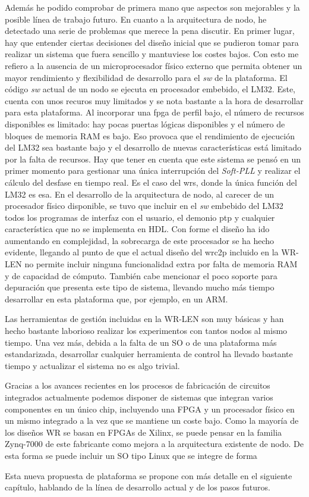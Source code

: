 Además he podido comprobar de primera mano que aspectos son mejorables y la 
posible línea de trabajo futuro. En cuanto a la arquitectura de nodo, he 
detectado una serie de problemas que merece la pena discutir. En primer lugar, 
hay que entender ciertas decisiones del diseño inicial que se pudieron tomar 
para realizar un sistema que fuera sencillo y mantuviese los costes bajos. Con 
esto me refiero a la ausencia de un microprocesador físico externo que permita 
obtener un mayor rendimiento y flexibilidad de desarrollo para el \textit{sw} 
de la plataforma. El código \textit{sw} actual de un nodo se ejecuta en 
procesador embebido, el LM32. Este, cuenta con unos recuros muy limitados y se 
nota 
bastante a la hora de desarrollar para esta plataforma. Al incorporar una 
\gls{fpga} de perfil bajo, el número de recursos disponibles es limitado: hay 
pocas puertas lógicas disponibles y el número de bloques de memoria RAM es 
bajo. Eso provoca que el rendimiento de ejecución del LM32 sea bastante bajo y 
el desarrollo de nuevas características está limitado por la falta de recursos. 
Hay que tener en cuenta que este sistema se pensó en un primer momento para 
gestionar una única interrupción del \textit{Soft-PLL} y realizar el cálculo 
del desfase en tiempo real. Es el caso del \gls{wrs}, donde la única función 
del LM32 es esa. En el desarrollo de la arquitectura de nodo, al carecer de un 
procesador físico disponible, se tuvo que incluir en el \textit{sw} embebido 
del LM32 todos los programas de interfaz con el usuario, el demonio \gls{ptp} y 
cualquier característica que no se implementa en HDL. Con forme el diseño ha 
ido aumentando en complejidad, la sobrecarga de este procesador se ha hecho 
evidente, llegando al punto de que el actual diseño del \gls{wrc2p} incluido en 
la WR-LEN no permite incluir ninguna funcionalidad extra por falta de memoria 
RAM y de capacidad de cómputo. También cabe mencionar el poco soporte para 
depuración que presenta este tipo de sistema, llevando mucho más tiempo 
desarrollar en esta plataforma que, por ejemplo, en un ARM.

Las herramientas de gestión incluidas en la WR-LEN son muy básicas y han hecho 
bastante laborioso realizar los experimentos con tantos nodos al mismo tiempo. 
Una vez más, debida a la falta de un SO o de una plataforma más estandarizada, 
desarrollar cualquier herramienta de control ha llevado bastante tiempo y 
actualizar el sistema no es algo trivial. 

Gracias a los avances recientes en los procesos de fabricación de circuitos 
integrados actualmente podemos disponer de sistemas que integran varios 
componentes en un único chip, incluyendo una FPGA y un procesador físico en un 
mismo integrado a la vez que se mantiene un coste bajo. Como la mayoría de los 
diseños WR se basan en FPGAs de Xilinx, se puede pensar en la familia Zynq-7000 
de este fabricante como mejora a la arquitectura existente de nodo. De esta 
forma se puede incluir un SO tipo Linux que se integre de forma 

Esta nueva propuesta de plataforma se propone con más detalle en el siguiente 
capítulo, hablando de la línea de desarrollo actual y de los pasos futuros.


